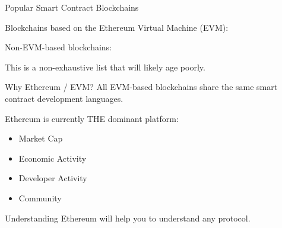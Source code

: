 \documentclass[handout]{beamer}
\begin{document}
\begin{frame}{Popular Smart Contract Blockchains}

Blockchains based on the Ethereum Virtual Machine (EVM):

\vspace{0.2em}

\begin{center}
\begin{tikzpicture}[scale=1, every node/.style={scale=1}]
	
\end{tikzpicture}
\end{center}

\vspace{1em}



Non-EVM-based blockchains:

\vspace{0.2em}

\begin{center}
\begin{tikzpicture}[scale=1, every node/.style={scale=1}]
	
\end{tikzpicture}
\end{center}

\vspace{1em}
This is a non-exhaustive list that will likely age poorly.

\end{frame}

\begin{frame}{Why Ethereum / EVM?}
	All EVM-based blockchains share the same smart contract development languages.
	
	\vspace{1 em}
	
	Ethereum is currently THE dominant platform:
	\begin{itemize}
		\item Market Cap
		\item Economic Activity
		\item Developer Activity
		\item Community
	\end{itemize}
	\vspace{1 em}
	Understanding Ethereum will help you to understand any protocol.
\end{frame}

\end{document}
